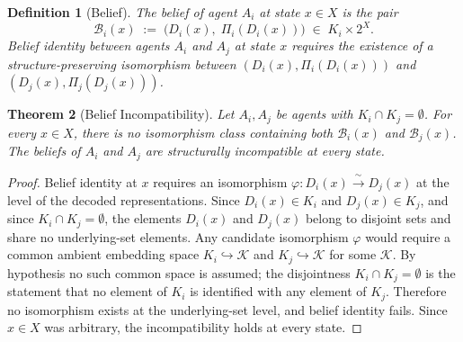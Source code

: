 \documentclass[twocolumn,11pt,a4paper]{article}
\newtheorem{theorem}{Theorem}[section]
\newtheorem{definition}[theorem]{Definition}
\theoremstyle{remark}
\newcommand{\Ksp}{\mathcal{K}}
\begin{document}
\begin{definition}[Belief]
\label{def:belief}
The \emph{belief} of agent $A_i$ at state $x \in X$ is the pair
\[
  \mathcal{B}_i(x) \;:=\; \bigl(D_i(x),\; \Pi_i(D_i(x))\bigr)
  \;\in\; K_i \times 2^X.
\]
\emph{Belief identity} between agents $A_i$ and $A_j$ at state $x$
requires the existence of a structure-preserving isomorphism between
$(D_i(x), \Pi_i(D_i(x)))$ and $(D_j(x), \Pi_j(D_j(x)))$.
\end{definition}

\begin{theorem}[Belief Incompatibility]
\label{thm:belief-incompatibility}
Let $A_i, A_j$ be agents with $K_i \cap K_j = \emptyset$.  For every
$x \in X$, there is no isomorphism class containing both $\mathcal{B}_i(x)$
and $\mathcal{B}_j(x)$.  The beliefs of $A_i$ and $A_j$ are structurally
incompatible at every state.
\end{theorem}
\begin{proof}
Belief identity at $x$ requires an isomorphism $\varphi: D_i(x) \xrightarrow{\;\sim\;} D_j(x)$ at the level of the decoded representations.  Since $D_i(x) \in K_i$ and $D_j(x) \in K_j$, and since $K_i \cap K_j = \emptyset$, the elements $D_i(x)$ and $D_j(x)$ belong to disjoint sets and share no underlying-set elements.  Any candidate isomorphism $\varphi$ would require a common ambient embedding space $K_i \hookrightarrow \Ksp$ and $K_j \hookrightarrow \Ksp$ for some $\Ksp$.  By hypothesis no such common space is assumed; the disjointness $K_i \cap K_j = \emptyset$ is the statement that no element of $K_i$ is identified with any element of $K_j$.  Therefore no isomorphism exists at the underlying-set level, and belief identity fails.  Since $x \in X$ was arbitrary, the incompatibility holds at every state.
\end{proof}
\end{document}
